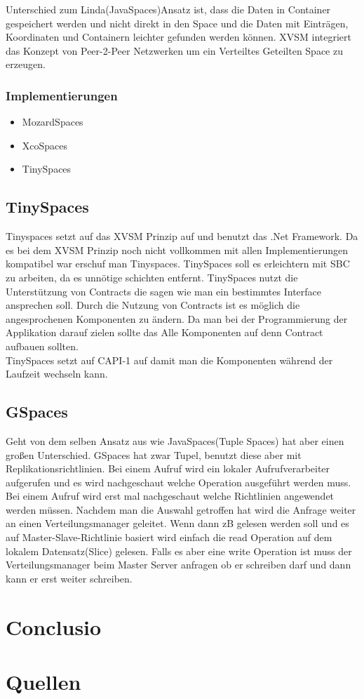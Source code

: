 \documentclass[a4paper,12pt]{scrreprt}
\begin{document}
		
		Unterschied zum Linda(JavaSpaces)Ansatz ist, dass die Daten in Container gespeichert werden und nicht direkt in den Space und die Daten mit Einträgen, Koordinaten und Containern leichter gefunden werden können.
		XVSM integriert das Konzept von Peer-2-Peer Netzwerken um ein Verteiltes Geteilten Space zu erzeugen.
		
		\subsection{Implementierungen}
			\begin{itemize}
				\item MozardSpaces
				\item XcoSpaces
				\item TinySpaces
			\end{itemize}
		
		
		\section{TinySpaces}
			Tinyspaces setzt auf das XVSM Prinzip auf und benutzt das .Net Framework. Da es bei dem XVSM Prinzip noch nicht vollkommen mit allen Implementierungen kompatibel war erschuf man Tinyspaces. 
			TinySpaces soll es erleichtern mit SBC zu arbeiten, da es unnötige schichten entfernt. 
			TinySpaces nutzt die Unterstützung von Contracts die sagen wie man ein bestimmtes Interface ansprechen soll.
			Durch die Nutzung von Contracts ist es möglich die angesprochenen Komponenten zu ändern. Da man bei der Programmierung der Applikation darauf zielen sollte das Alle Komponenten auf denn Contract aufbauen sollten.\\
			TinySpaces setzt auf CAPI-1 auf damit man die Komponenten während der Laufzeit wechseln kann.
		\section{GSpaces}
		Geht von dem selben Ansatz aus wie JavaSpaces(Tuple Spaces) hat aber einen großen Unterschied. GSpaces hat zwar Tupel, benutzt diese aber mit Replikationsrichtlinien.  Bei einem Aufruf wird ein lokaler Aufrufverarbeiter aufgerufen und es wird nachgeschaut welche Operation ausgeführt werden muss. Bei  einem Aufruf wird erst mal nachgeschaut welche Richtlinien angewendet werden müssen. Nachdem man die Auswahl getroffen hat wird die Anfrage weiter an einen Verteilungsmanager geleitet.  Wenn dann zB gelesen werden soll und es auf Master-Slave-Richtlinie basiert wird einfach die read Operation auf dem lokalem Datensatz(Slice) gelesen. Falls es aber eine write Operation ist muss der Verteilungsmanager beim Master Server anfragen ob er schreiben darf und dann kann er erst weiter schreiben.	
	
\chapter{Conclusio}

\chapter{Quellen}
\end{document}
